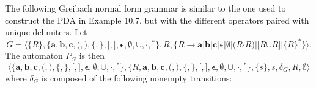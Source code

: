 The following Greibach normal form grammar is similar to the one used to
construct the PDA in Example 10.7, but with the different operators paired with
unique delimiters. Let
\[ G=\langle\{R\},\{\pmb{a},\pmb{b},\pmb{c},\pmb{(},\pmb{)},\pmb{\{},\pmb{\}},
	\pmb{[},\pmb{]},\pmb{\epsilon},\pmb{\emptyset},\pmb{\cup},\pmb{\cdot},
	\pmb{^*}\},R,\{R\rightarrow\pmb{a}|\pmb{b}|\pmb{c}|\pmb{\epsilon}|
	\pmb{\emptyset}|\pmb{(}R\pmb{\cdot}R\pmb{)}|\pmb{[}R\pmb{\cup}R\pmb{]}|
	\pmb{\{}R\pmb{\}}^*\}\rangle. \]
The automaton $P_G$ is then
\[ \langle\{\pmb{a},\pmb{b},\pmb{c},\pmb{(},\pmb{)},\pmb{\{},\pmb{\}},\pmb{[},
	\pmb{]},\pmb{\epsilon},\pmb{\emptyset},\pmb{\cup},\pmb{\cdot},\pmb{^*}\},
	\{R,\pmb{a},\pmb{b},\pmb{c},\pmb{(},\pmb{)},\pmb{\{},\pmb{\}},\pmb{[},
	\pmb{]},\pmb{\epsilon},\pmb{\emptyset},\pmb{\cup},\pmb{\cdot},\pmb{^*}\},\{s\},s,
	\delta_G,R,\emptyset\rangle \]
where $\delta_G$ is composed of the following nonempty transitions:

